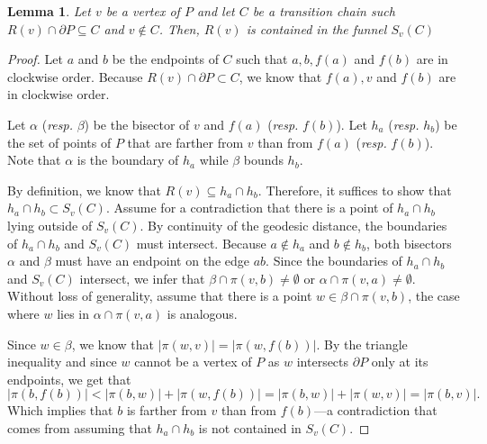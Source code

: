 \documentclass[a4paper]{article}
\newtheorem{lemma}[theorem]{Lemma}
\newcommand{\fn}[2]{\ensuremath{S_{\scriptscriptstyle #1}(#2)}}
\newcommand{\ff}[1]{\ensuremath{f(#1)}}
\newcommand{\g}[2]{\ensuremath{|\pi(#1, #2)|}}
\newcommand{\p}[2]{\ensuremath{\pi(#1, #2)}}
\begin{document}
\begin{lemma}\label{lemma:Funnel contains Voronoi region}
Let $v$ be a vertex of $P$ and let $C$ be a transition chain such $R(v)\cap \partial P \subseteq C$ and $v\not\in C$.
Then, $R(v)$ is contained in the funnel $\fn{v}{C}$
\end{lemma}
\begin{proof}
Let $a$ and $b$ be the endpoints of $C$ such that $a,b, \ff{a}$ and $\ff{b}$ are in clockwise order.
Because $R(v)\cap \partial P\subset C$, we know that $\ff{a}, v$ and $\ff{b}$ are in clockwise order.

Let $\alpha$ (\emph{resp.} $\beta$) be the bisector of $v$ and $\ff{a}$ (\emph{resp.} $\ff{b}$).
Let $h_a$ (\emph{resp.} $h_b$) be the set of points of $P$ that are farther from $v$ than from $\ff{a}$ (\emph{resp.} $\ff{b}$).
Note that $\alpha$ is the boundary of $h_a$ while $\beta$ bounds $h_b$.

By definition, we know that $R(v)\subseteq h_a\cap h_b$. Therefore, it suffices to show that $h_a\cap h_b\subset \fn{v}{C}$.
Assume for a contradiction that there is a point of $h_a\cap h_b$ lying outside of $\fn{v}{C}$. 
By continuity of the geodesic distance, the boundaries of $h_a\cap h_b$ and $\fn{v}{C}$ must intersect.
Because $a\notin h_a$ and $b\notin h_b$, both bisectors $\alpha$ and $\beta$ must have an endpoint on the edge $ab$.
Since the boundaries of $h_a\cap h_b$ and $\fn{v}{C}$ intersect, we infer that $\beta \cap \p{v}{b}\neq \emptyset$ or $\alpha \cap \p{v}{a}\neq \emptyset$.
Without loss of generality, assume that there is a point $w\in \beta \cap \p{v}{b}$, the case where $w$ lies in $\alpha \cap \p{v}{a}$ is analogous. 

Since $w\in \beta$, we know that $\g{w}{v} = \g{w}{ \ff{b}}$. By the triangle inequality and since $w$ cannot be a vertex of $P$ as $w$ intersects $\partial P$ only at its endpoints, we get that
$$\g{b}{\ff{b}} < \g{b}{w} + \g{w}{\ff{b}} = \g{b}{w} + \g{w}{v} = \g{b}{v}.$$
Which implies that $b$ is farther from $v$ than from $\ff{b}$---a contradiction that comes from assuming that $h_a\cap h_b$ is not contained in $\fn{v}{C}$.
\end{proof}
\end{document}
